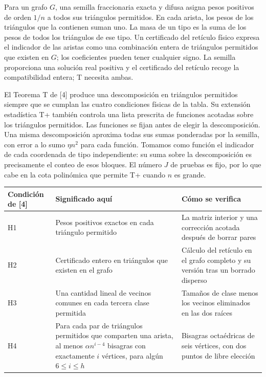 \documentclass[spanish,11pt,a4paper]{article}
\begin{document}
Para un grafo \(G\), una semilla fraccionaria exacta y difusa asigna pesos positivos de orden \(1/n\) a todos sus triángulos permitidos. En cada arista, los pesos de los triángulos que la contienen suman uno. La masa de un tipo es la suma de los pesos de todos los triángulos de ese tipo. Un certificado del retículo físico expresa el indicador de las aristas como una combinación entera de triángulos permitidos que existen en \(G\); los coeficientes pueden tener cualquier signo. La semilla proporciona una solución real positiva y el certificado del retículo recoge la compatibilidad entera; T necesita ambas.

El Teorema T de {[}4{]} produce una descomposición en triángulos permitidos siempre que se cumplan las cuatro condiciones físicas de la tabla. Su extensión estadística T+ también controla una lista prescrita de funciones acotadas sobre los triángulos permitidos. Las funciones se fijan antes de elegir la descomposición. Una misma descomposición aproxima todas sus sumas ponderadas por la semilla, con error a lo sumo \(\eta n^2\) para cada función. Tomamos como función el indicador de cada coordenada de tipo independiente: su suma sobre la descomposición es precisamente el conteo de esos bloques. El número \(J\) de pruebas es fijo, por lo que cabe en la cota polinómica que permite T+ cuando \(n\) es grande.

{\begin{longtable}[]{@{}
  >{\raggedright\arraybackslash}p{}
  >{\raggedright\arraybackslash}p{}
  >{\raggedright\arraybackslash}p{}@{}}
\toprule\noalign{}
\begin{minipage}[b]{\linewidth}\raggedright
Condición de {[}4{]}
\end{minipage} & \begin{minipage}[b]{\linewidth}\raggedright
Significado aquí
\end{minipage} & \begin{minipage}[b]{\linewidth}\raggedright
Cómo se verifica
\end{minipage} \\
\midrule\noalign{}
\endhead
\bottomrule\noalign{}
\endlastfoot
H1 & Pesos positivos exactos en cada triángulo permitido & La matriz interior y una corrección acotada después de borrar pares \\
H2 & Certificado entero en triángulos que existen en el grafo & Cálculo del retículo en el grafo completo y su versión tras un borrado disperso \\
H3 & Una cantidad lineal de vecinos comunes en cada tercera clase permitida & Tamaños de clase menos los vecinos eliminados en las dos raíces \\
H4 & Para cada par de triángulos permitidos que comparten una arista, al menos \(\alpha n^{i-4}\) bisagras con exactamente \(i\) vértices, para algún \(6\le i\le h\) & Bisagras octaédricas de seis vértices, con dos puntos de libre elección \\
\end{longtable}
}
\end{document}
